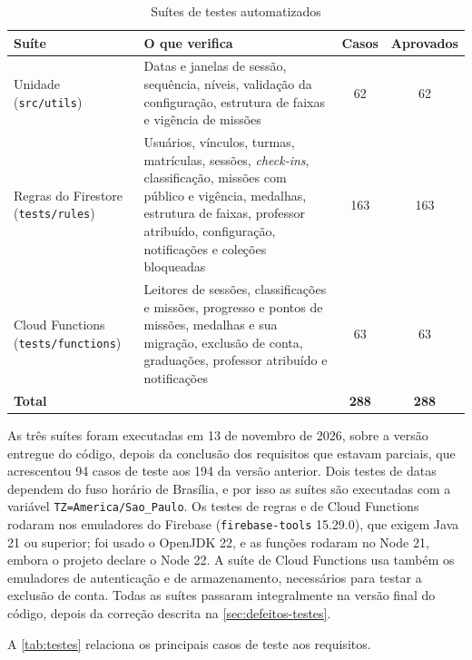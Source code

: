\begin{table}[H]
  \centering
  \caption{Suítes de testes automatizados}
  \label{tab:suites}
  \footnotesize
  \begin{tabular}{p{3.6cm}p{6.6cm}cc}
    \toprule
    \textbf{Suíte} & \textbf{O que verifica} & \textbf{Casos} & \textbf{Aprovados} \\
    \midrule
    Unidade (\texttt{src/utils}) & Datas e janelas de sessão, sequência, níveis, validação da configuração, estrutura de faixas e vigência de missões & 62 & 62 \\
    Regras do Firestore (\texttt{tests/rules}) & Usuários, vínculos, turmas, matrículas, sessões, \textit{check-ins}, classificação, missões com público e vigência, medalhas, estrutura de faixas, professor atribuído, configuração, notificações e coleções bloqueadas & 163 & 163 \\
    Cloud Functions (\texttt{tests/functions}) & Leitores de sessões, classificações e missões, progresso e pontos de missões, medalhas e sua migração, exclusão de conta, graduações, professor atribuído e notificações & 63 & 63 \\
    \midrule
    \textbf{Total} & & \textbf{288} & \textbf{288} \\
    \bottomrule
  \end{tabular}
\end{table}

As três suítes foram executadas em 13 de novembro de 2026, sobre a versão entregue do código,
depois da conclusão dos requisitos que estavam parciais, que acrescentou
94 casos de teste aos 194 da versão anterior. Dois testes de datas
dependem do fuso horário de Brasília, e por isso as suítes são executadas
com a variável \texttt{TZ=America/Sao\_Paulo}. Os testes de
regras e de Cloud Functions rodaram nos emuladores do Firebase
(\texttt{firebase-tools} 15.29.0), que exigem Java 21 ou superior; foi
usado o OpenJDK 22, e as funções rodaram no Node 21, embora o projeto
declare o Node 22. A suíte de Cloud Functions usa também os emuladores de
autenticação e de armazenamento, necessários para testar a exclusão de
conta. Todas as suítes passaram integralmente na versão final
do código, depois da correção descrita na
\autoref{sec:defeitos-testes}.

A \autoref{tab:testes} relaciona os principais casos de teste aos
requisitos.

